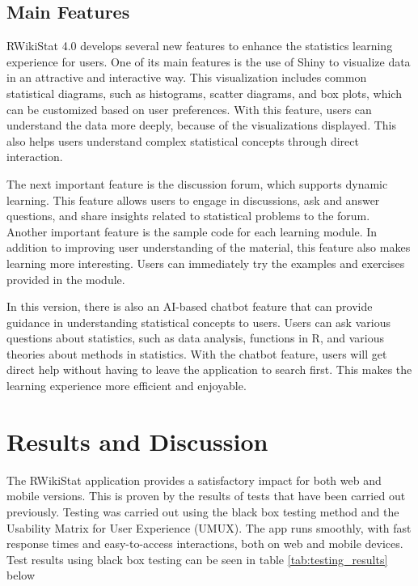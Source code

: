 \documentclass[conference,a4paper]{IEEEtran}
\begin{document}
\subsection{Main Features}
RWikiStat 4.0 develops several new features to enhance the statistics learning
experience for users. One of its main features is the use of Shiny to visualize
data in an attractive and interactive way. This visualization includes common
statistical diagrams, such as histograms, scatter diagrams, and box plots,
which can be customized based on user preferences. With this feature, users can
understand the data more deeply, because of the visualizations displayed. This
also helps users understand complex statistical concepts through direct
interaction.

The next important feature is the discussion forum, which supports dynamic
learning. This feature allows users to engage in discussions, ask and answer
questions, and share insights related to statistical problems to the forum.
Another important feature is the sample code for each learning module. In
addition to improving user understanding of the material, this feature also
makes learning more interesting. Users can immediately try the examples and
exercises provided in the module.

In this version, there is also an AI-based chatbot feature that can provide
guidance in understanding statistical concepts to users. Users can ask various
questions about statistics, such as data analysis, functions in R, and various
theories about methods in statistics. With the chatbot feature, users will get
direct help without having to leave the application to search first. This makes
the learning experience more efficient and enjoyable.

\section{Results and Discussion}
\label{sect:results_discussion}

The RWikiStat application provides a satisfactory impact for both web and
mobile versions. This is proven by the results of tests that have been carried
out previously. Testing was carried out using the black box testing method and
the Usability Matrix for User Experience (UMUX). The app runs smoothly, with
fast response times and easy-to-access interactions, both on web and mobile
devices. Test results using black box testing can be seen in table
\ref{tab:testing_results} below
\end{document}
